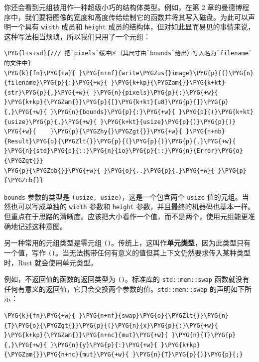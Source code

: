 你还会看到元组被用作一种超级小巧的结构体类型。例如，在第 2 章的曼德博程序中，我们要将图像的宽度和高度传给绘制它的函数并将其写入磁盘。为此可以声明一个具有 \texttt{width} 成员和 \texttt{height} 成员的结构体，但对如此显而易见的事情来说，这种写法相当烦琐，所以我们只用了一个元组：

\begin{Verbatim}[commandchars=\\\{\},breaklines=true,breakanywhere=true,fontsize=\codefont,xleftmargin=17bp]
\PYG{l+s+sd}{/// 把`pixels`缓冲区（其尺寸由`bounds`给出）写入名为`filename`的文件中}
\PYG{k}{fn}\PYG{+w}{ }\PYG{n+nf}{write\PYGZus{}image}\PYG{p}{(}\PYG{n}{filename}\PYG{p}{:}\PYG{+w}{ }\PYG{k+kp}{\PYGZam{}}\PYG{k+kt}{str}\PYG{p}{,}\PYG{+w}{ }\PYG{n}{pixels}\PYG{p}{:}\PYG{+w}{ }\PYG{k+kp}{\PYGZam{}}\PYG{p}{[}\PYG{k+kt}{u8}\PYG{p}{]}\PYG{p}{,}\PYG{+w}{ }\PYG{n}{bounds}\PYG{p}{:}\PYG{+w}{ }\PYG{p}{(}\PYG{k+kt}{usize}\PYG{p}{,}\PYG{+w}{ }\PYG{k+kt}{usize}\PYG{p}{)}\PYG{p}{)}
\PYG{+w}{    }\PYG{p}{\PYGZhy{}\PYGZgt{}}\PYG{+w}{ }\PYG{n+nb}{Result}\PYG{o}{\PYGZlt{}}\PYG{p}{(}\PYG{p}{)}\PYG{p}{,}\PYG{+w}{ }\PYG{n}{std}\PYG{p}{::}\PYG{n}{io}\PYG{p}{::}\PYG{n}{Error}\PYG{o}{\PYGZgt{}}
\PYG{p}{\PYGZob{}}\PYG{+w}{ }\PYG{o}{..}\PYG{p}{.}\PYG{+w}{ }\PYG{p}{\PYGZcb{}}
\end{Verbatim}

\texttt{bounds} 参数的类型是 \texttt{(usize, usize)}，这是一个包含两个 \texttt{usize} 值的元组。当然也可以写成单独的 \texttt{width} 参数和 \texttt{height} 参数，并且最终的机器码也基本一样。但重点在于思路的清晰度。应该把大小看作一个值，而不是两个，使用元组能更准确地记述这种意图。

另一种常用的元组类型是零元组 \texttt{()}。传统上，这叫作\textbf{单元类型}，因为此类型只有一个值，写作 \texttt{()}。当无法携带任何有意义的值但其上下文仍然要求传入某种类型时，Rust 就会使用单元类型。

例如，不返回值的函数的返回类型为 \texttt{()}。标准库的 \texttt{std::mem::swap} 函数就没有任何有意义的返回值，它只会交换两个参数的值。\texttt{std::mem::swap} 的声明如下所示：

\begin{Verbatim}[commandchars=\\\{\},breaklines=true,breakanywhere=true,fontsize=\codefont,xleftmargin=17bp]
\PYG{k}{fn}\PYG{+w}{ }\PYG{n+nf}{swap}\PYG{o}{\PYGZlt{}}\PYG{n}{T}\PYG{o}{\PYGZgt{}}\PYG{p}{(}\PYG{n}{x}\PYG{p}{:}\PYG{+w}{ }\PYG{k+kp}{\PYGZam{}}\PYG{n+nc}{mut}\PYG{+w}{ }\PYG{n}{T}\PYG{p}{,}\PYG{+w}{ }\PYG{n}{y}\PYG{p}{:}\PYG{+w}{ }\PYG{k+kp}{\PYGZam{}}\PYG{n+nc}{mut}\PYG{+w}{ }\PYG{n}{T}\PYG{p}{)}\PYG{p}{;}
\end{Verbatim}

